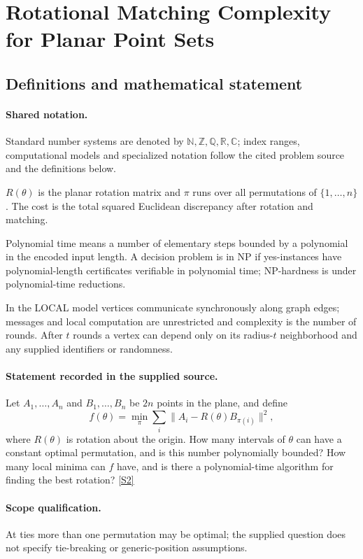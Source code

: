 \documentclass[11pt]{article}
\newcommand{\sref}[2]{\hyperlink{source:#1:#2}{[S#2]}}
\begin{document}
\section{Rotational Matching Complexity for Planar Point Sets}\label{statement}

\subsection{Definitions and mathematical statement}

\paragraph{Shared notation.}Standard number systems are denoted by $\mathbb N,\mathbb Z,\mathbb Q,\mathbb R,\mathbb C$; index ranges, computational models and specialized notation follow the cited problem source and the definitions below.


$R(\theta)$ is the planar rotation matrix and $\pi$ runs over all permutations of $\{1,\ldots,n\}$. The cost is the total squared Euclidean discrepancy after rotation and matching.

Polynomial time means a number of elementary steps bounded by a polynomial in the encoded input length. A decision problem is in $\mathrm{NP}$ if yes-instances have polynomial-length certificates verifiable in polynomial time; NP-hardness is under polynomial-time reductions.

In the LOCAL model vertices communicate synchronously along graph edges; messages and local computation are unrestricted and complexity is the number of rounds. After $t$ rounds a vertex can depend only on its radius-$t$ neighborhood and any supplied identifiers or randomness.
\paragraph{Statement recorded in the supplied source.}
Let $A_1,\ldots,A_n$ and $B_1,\ldots,B_n$ be $2n$ points in the plane, and define $$f(\theta)=\min_{\pi}\sum_i\|A_i-R(\theta)B_{\pi(i)}\|^2,$$ where $R(\theta)$ is rotation about the origin. How many intervals of $\theta$ can have a constant optimal permutation, and is this number polynomially bounded? How many local minima can $f$ have, and is there a polynomial-time algorithm for finding the best rotation? \sref{statement}{2}
\paragraph{Scope qualification.}
At ties more than one permutation may be optimal; the supplied question does not specify tie-breaking or generic-position assumptions.
\end{document}
